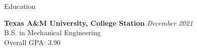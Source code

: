 \documentclass[
	11pt, %
]{resume} %
\begin{document}
\begin{rSection}{Education}
	
	\textbf{Texas A\&M University, College Station} \hfill \textit{December 2021} \\ 
	B.S. in Mechanical Engineering \\
	Overall GPA: 3.90
	
\end{rSection}

\end{document}

